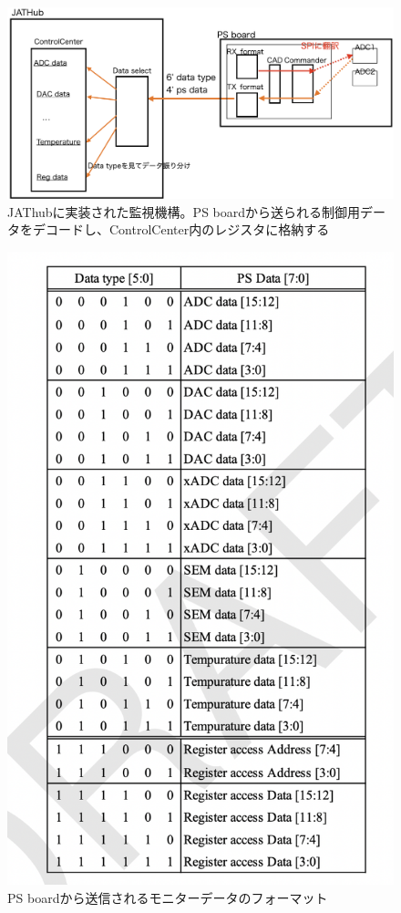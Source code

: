 \begin{figure} 
\centering
\includegraphics[width=16cm]{fig/QAQC/JATHubmonitor.png}
\caption[JATHub monitor]{JAThubに実装された監視機構。PS boardから送られる制御用データをデコードし、ControlCenter内のレジスタに格納する}
\label{JATHubmonitor}
\end{figure}

\begin{figure} 
\centering
\includegraphics[width=16cm]{fig/QAQC/PSBdataformat.png}
\caption[PS boardから送信されるモニターデータのフォーマット]{PS boardから送信されるモニターデータのフォーマット}
\label{PSBdataformat}
\end{figure}


